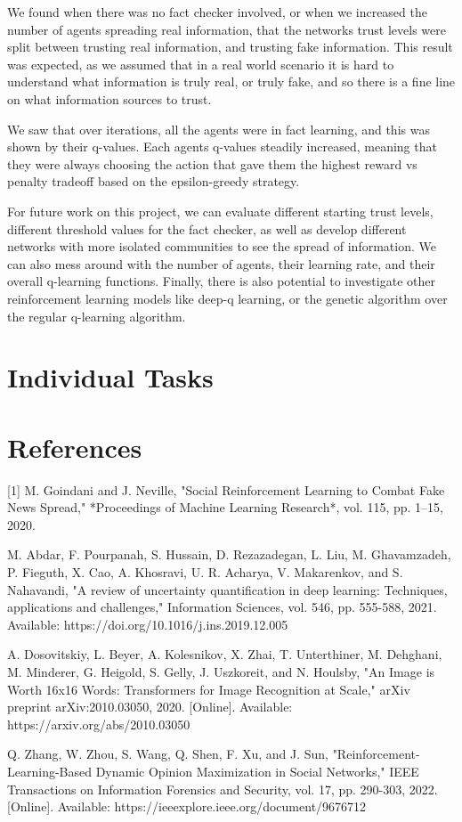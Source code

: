 \documentclass[twoside]{article}
\begin{document}
We found when there was no fact checker involved, or when we increased the number of agents spreading real information, that the networks trust levels were split between trusting real information, and trusting fake information. This result was expected, as we assumed that in a real world scenario it is hard to understand what information is truly real, or truly fake, and so there is a fine line on what information sources to trust.

We saw that over iterations, all the agents were in fact learning, and this was shown by their q-values. Each agents q-values steadily increased, meaning that they were always choosing the action that gave them the highest reward vs penalty tradeoff based on the epsilon-greedy strategy.

For future work on this project, we can evaluate different starting trust levels, different threshold values for the fact checker, as well as develop different networks with more isolated communities to see the spread of information. We can also mess around with the number of agents, their learning rate, and their overall q-learning functions. Finally, there is also potential to investigate other reinforcement learning models like deep-q learning, or the genetic algorithm over the regular q-learning algorithm.

\section{Individual Tasks}

\section{References}
[1] M. Goindani and J. Neville, "Social Reinforcement Learning to Combat Fake News Spread," *Proceedings of Machine Learning Research*, vol. 115, pp. 1–15, 2020.

\sloppy
[2] M. Abdar, F. Pourpanah, S. Hussain, D. Rezazadegan, L. Liu, M. Ghavamzadeh, P. Fieguth, X. Cao, A. Khosravi, U. R. Acharya, V. Makarenkov, and S. Nahavandi, "A review of uncertainty quantification in deep learning: Techniques, applications and challenges," Information Sciences, vol. 546, pp. 555-588, 2021. Available: https://doi.org/10.1016/j.ins.2019.12.005

\sloppy
[3] A. Dosovitskiy, L. Beyer, A. Kolesnikov, X. Zhai, T. Unterthiner, M. Dehghani, M. Minderer, G. Heigold, S. Gelly, J. Uszkoreit, and N. Houlsby, "An Image is Worth 16x16 Words: Transformers for Image Recognition at Scale," arXiv preprint arXiv:2010.03050, 2020. [Online]. Available: https://arxiv.org/abs/2010.03050

\sloppy
[4] Q. Zhang, W. Zhou, S. Wang, Q. Shen, F. Xu, and J. Sun, "Reinforcement-Learning-Based Dynamic Opinion Maximization in Social Networks," IEEE Transactions on Information Forensics and Security, vol. 17, pp. 290-303, 2022. [Online]. Available: https://ieeexplore.ieee.org/document/9676712


%
\end{document}
